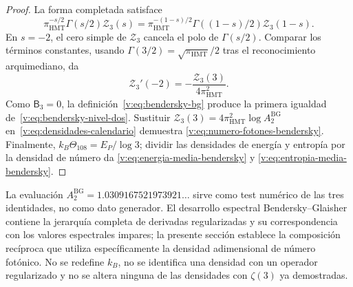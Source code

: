 \begin{proof}
La forma completada satisface
\[
 \pi_{\mathrm{HMT}}^{-s/2}\Gamma(s/2)\mathcal Z_3(s)
 =\pi_{\mathrm{HMT}}^{-(1-s)/2}
  \Gamma((1-s)/2)\mathcal Z_3(1-s).
\]
En \(s=-2\), el cero simple de \(\mathcal Z_3\) cancela el polo de
\(\Gamma(s/2)\). Comparar los términos constantes, usando
\(\Gamma(3/2)=\sqrt{\pi_{\mathrm{HMT}}}/2\) tras el reconocimiento
arquimediano, da
\[
 \mathcal Z_3'(-2)=-\frac{\mathcal Z_3(3)}{4\pi_{\mathrm{HMT}}^2}.
\]
Como \(\mathsf B_3=0\), la definición~\eqref{v:eq:bendersky-bg}
produce la primera igualdad de~\eqref{v:eq:bendersky-nivel-dos}.
Sustituir
\(\mathcal Z_3(3)=4\pi_{\mathrm{HMT}}^2\log A_2^{\mathrm{BG}}\)
en~\eqref{v:eq:densidades-calendario} demuestra
\eqref{v:eq:numero-fotones-bendersky}. Finalmente,
\(k_B\Theta_{108}=E_P/\log3\); dividir las densidades de energía y
entropía por la densidad de número da
\eqref{v:eq:energia-media-bendersky} y
\eqref{v:eq:entropia-media-bendersky}.
\end{proof}

La evaluación \(A_2^{\mathrm{BG}}=1.0309167521973921\ldots\) sirve como
test numérico de las tres identidades, no como dato generador. El desarrollo
espectral Bendersky--Glaisher contiene la jerarquía completa de derivadas
regularizadas y su correspondencia con los valores espectrales impares; la presente sección
establece la composición recíproca que utiliza específicamente la densidad
adimensional de número fotónico. No se redefine \(k_B\), no se identifica una densidad con un
operador regularizado y no se altera ninguna de las densidades con
\(\zeta(3)\) ya demostradas.

